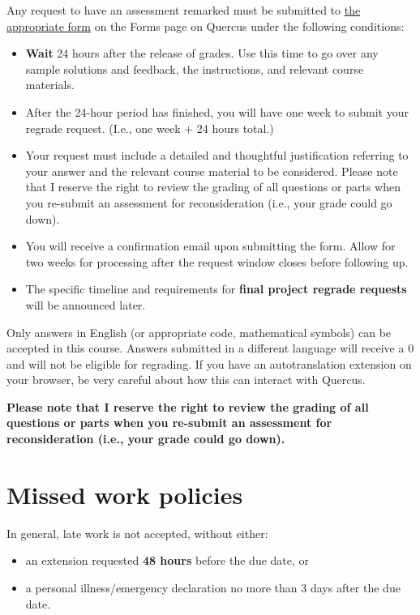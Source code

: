 \documentclass[
  openany]{book}
\begin{document}
Any request to have an assessment remarked must be submitted to \href{https://q.utoronto.ca/courses/253305/pages/forms}{the appropriate form} on the Forms page on Quercus under the following conditions:

\begin{itemize}
\item
  \textbf{Wait} 24 hours after the release of grades. Use this time to go over any sample solutions and feedback, the instructions, and relevant course materials.
\item
  After the 24-hour period has finished, you will have one week to submit your regrade request. (I.e., one week + 24 hours total.)
\item
  Your request must include a detailed and thoughtful justification referring to your answer and the relevant course material to be considered. Please note that I reserve the right to review the grading of all questions or parts when you re-submit an assessment for reconsideration (i.e., your grade could go down).
\item
  You will receive a confirmation email upon submitting the form. Allow for two weeks for processing after the request window closes before following up.
\item
  The specific timeline and requirements for \textbf{final project regrade requests} will be announced later.
\end{itemize}

Only answers in English (or appropriate code, mathematical symbols) can be accepted in this course. Answers submitted in a different language will receive a 0 and will not be eligible for regrading. If you have an autotranslation extension on your browser, be very careful about how this can interact with Quercus.

\textbf{Please note that I reserve the right to review the grading of all questions or parts when you re-submit an assessment for reconsideration (i.e., your grade could go down).}

\hypertarget{missed-work-policies}{%
\section{Missed work policies}\label{missed-work-policies}}

In general, late work is not accepted, without either:

\begin{itemize}
\item
  an extension requested \textbf{48 hours} before the due date, or
\item
  a personal illness/emergency declaration no more than 3 days after the due date.
\end{itemize}
\end{document}

